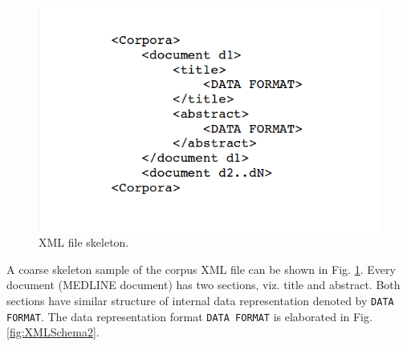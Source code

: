 \begin{enumerate}
\begin{figure}
\centering
\includegraphics[scale=0.4]{figures/XMLSchema1.png}
\caption{XML file skeleton.}\label{fig:XMLSchema1}
\end{figure}

A coarse skeleton sample of the corpus XML file can be shown in Fig. \ref{fig:XMLSchema1}. Every document (MEDLINE document) has two sections, viz. title and abstract. Both sections have similar structure of internal data representation denoted by \texttt{DATA FORMAT}. The data representation format \texttt{DATA FORMAT} is elaborated in Fig. \ref{fig:XMLSchema2}.


\end{enumerate}
